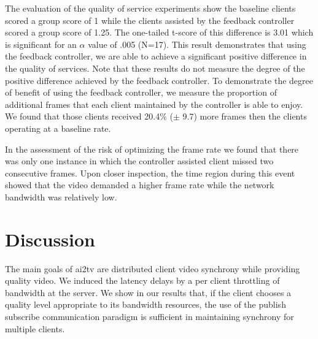 \documentclass{sig-alternate}
\begin{document}
The evaluation of the quality of service experiments show the baseline
clients scored a group score of 1 while the clients assisted by the
feedback controller scored a group score of 1.25.  The one-tailed
t-score of this difference is 3.01 which is significant for an
$\alpha$ value of .005 (N=17).  This result demonstrates that using
the feedback controller, we are able to achieve a significant positive
difference in the quality of services.  Note that these results do not
measure the degree of the positive difference achieved by the feedback
controller.  To demonstrate the degree of benefit of using the
feedback controller, we measure the proportion of additional frames
that each client maintained by the controller is able to enjoy.  We
found that those clients received 20.4\% ($\pm$ 9.7) more frames then
the clients operating at a baseline rate.

In the assessment of the risk of optimizing the frame rate we found
that there was only one instance in which the controller assisted
client missed two consecutive frames.  Upon closer inspection, the
time region during this event showed that the video demanded a higher
frame rate while the network bandwidth was relatively low.


\section{Discussion} \label{discussion}

The main goals of ai2tv are distributed client video synchrony while
providing quality video.  We induced the latency delays by a per
client throttling of bandwidth at the server.  We show in our results
that, if the client chooses a quality level appropriate to its
bandwidth resources, the use of the publish subscribe communication
paradigm is sufficient in maintaining synchrony for multiple clients.
\end{document}
